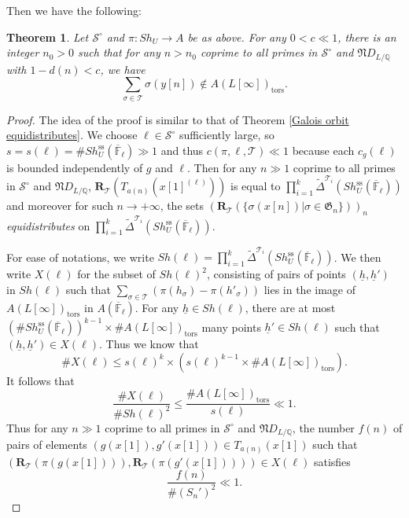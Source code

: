 \documentclass[11pt,oneside,reqno]{amsart}
\newcommand{\ssrm}{\mathrm{ss}}
\newcommand{\F}{\mathbb{F}}
\newcommand{\Q}{\mathbb{Q}}
\newcommand{\Scal}{\mathcal{S}}
\newcommand{\Tcal}{\mathcal{T}}
\newcommand{\Rbf}{\mathbf{R}}
\newcommand{\Gfrak}{\mathfrak{G}}
\newcommand{\Nfrak}{\mathfrak{N}}
\theoremstyle{plain}
\newtheorem{theorem}{Theorem}[section]
\begin{document}
	
	
	Then we have the following:
	\begin{theorem}\label{S^circ}
		Let $\Scal^\circ$ and $\pi\colon Sh_U\to A$ be as above. For any $0<c\ll1$, there is an integer $n_0>0$ such that for any $n>n_0$ coprime to all primes in $\Scal^\circ$ and $\Nfrak D_{L/\Q}$ with $1-d(n)<c$, we have
		\[
		\sum_{\sigma\in\Tcal}\sigma(y[n])\notin A(L[\infty])_\mathrm{tors}.
		\]
	\end{theorem}
	\begin{proof}
		The idea of the proof is similar to that of Theorem \ref{Galois orbit equidistributes}. We choose $\ell\in\Scal^\circ$ sufficiently large, so $s=s(\ell)=\#Sh_U^\ssrm(\overline{\F}_\ell)\gg1$ and thus $c(\pi,\ell,\Tcal)\ll1$ because each $c_g(\ell)$ is bounded independently of $g$ and $\ell$. Then for any $n\gg1$ coprime to all primes in $\Scal^\circ$ and $\Nfrak D_{L/\Q}$, $\Rbf_{\Tcal}(T_{a(n)}(x[1]^{(\ell)}))$ is equal to $\prod_{i=1}^k\widetilde{\Delta}^{\Tcal_{i}}(Sh_U^\ssrm(\overline{\F}_\ell))$ and moreover for such $n\to+\infty$, the sets $(\Rbf_{\Tcal}(\{\sigma(x[n])|\sigma\in\Gfrak_n\}))_n$ \emph{equidistributes} on $\prod_{i=1}^k\widetilde{\Delta}^{\Tcal_{i}}(Sh_U^\ssrm(\overline{\F}_\ell))$.
		
		
		
		
		
		
		For ease of notations, we write $Sh(\ell)=\prod_{i=1}^k\widetilde{\Delta}^{\Tcal_{i}}(Sh_U^\ssrm(\overline{\F}_\ell))$. We then write $X(\ell)$ for the subset of $Sh(\ell)^2$, consisting of pairs of points $(\underline{h},\underline{h}')$ in $Sh(\ell)$ such that $\sum_{\sigma\in\Tcal}(\pi(h_\sigma)-\pi(h'_\sigma))$ lies in the image of $A(L[\infty])_\mathrm{tors}$ in $A(\overline{\F}_\ell)$. For any $\underline{h}\in Sh(\ell)$, there are at most $(\#Sh_U^\ssrm(\overline{\F}_\ell))^{k-1}\times\#A(L[\infty])_\mathrm{tors}$ many points $\underline{h}'\in Sh(\ell)$ such that $(\underline{h},\underline{h}')\in X(\ell)$. Thus we know that
		\[
		\#X(\ell)\leq s(\ell)^k\times(s(\ell)^{k-1}\times\#A(L[\infty])_\mathrm{tors}).
		\]
		It follows that
		\[
		\frac{\#X(\ell)}{\#Sh(\ell)^2}
		\leq
		\frac{\#A(L[\infty])_\mathrm{tors}}{s(\ell)}\ll1.
		\]
		Thus for any $n\gg1$ coprime to all primes in $\Scal^\circ$ and $\Nfrak D_{L/\Q}$, the number $f(n)$ of pairs of elements $(g(x[1]),g'(x[1]))\in T_{a(n)}(x[1])$ such that $(\Rbf_{\Tcal}(\pi(g(x[1]))),\Rbf_{\Tcal}(\pi(g'(x[1]))))\in X(\ell)$ satisfies
		\[
		\frac{f(n)}{\#(S_n')^2}\ll1.
		\]
		
		
		

\end{proof}
\end{document}
